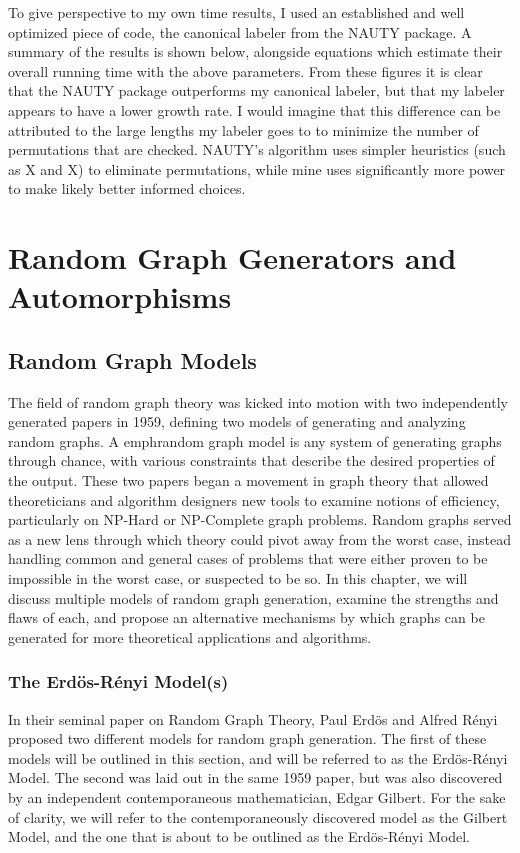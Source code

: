 \documentclass[11pt,a4paper]{report}
\begin{document}
To give perspective to my own time results, I used an established and well optimized piece of code, the canonical labeler from the NAUTY package.
A summary of the results is shown below, alongside equations which estimate their overall running time with the above parameters.
From these figures it is clear that the NAUTY package outperforms my canonical labeler, but that my labeler appears to have a lower growth rate.
I would imagine that this difference can be attributed to the large lengths my labeler goes to to minimize the number of permutations that are checked.
NAUTY's algorithm uses simpler heuristics (such as X and X) to eliminate permutations, while mine uses significantly more power to make likely better informed choices.



\chapter{Random Graph Generators and Automorphisms}

\section{Random Graph Models}


The field of random graph theory was kicked into motion with two independently generated papers in 1959, defining two models of generating and analyzing random graphs.
A emph{random graph model} is any system of generating graphs through chance, with various constraints that describe the desired properties of the output.
These two papers began a movement in graph theory that allowed theoreticians and algorithm designers new tools to examine notions of efficiency, particularly on NP-Hard or NP-Complete graph problems.
Random graphs served as a new lens through which theory could pivot away from the worst case, instead handling common and general cases of problems that were either proven to be impossible in the worst case, or suspected to be so. 
In this chapter, we will discuss multiple models of random graph generation, examine the strengths and flaws of each, and propose an alternative mechanisms by which graphs can be generated for more theoretical applications and algorithms.

\subsection{The Erd\"os-R\'enyi Model(s)}

In their seminal paper on Random Graph Theory, Paul Erd\"os and Alfred R\'enyi proposed two different models for random graph generation.
The first of these models will be outlined in this section, and will be referred to as the Erd\"os-R\'enyi Model.
The second was laid out in the same 1959 paper, but was also discovered by an independent contemporaneous mathematician, Edgar Gilbert.
For the sake of clarity, we will refer to the contemporaneously discovered model as the Gilbert Model, and the one that is about to be outlined as the Erd\"os-R\'enyi Model.
\end{document}
